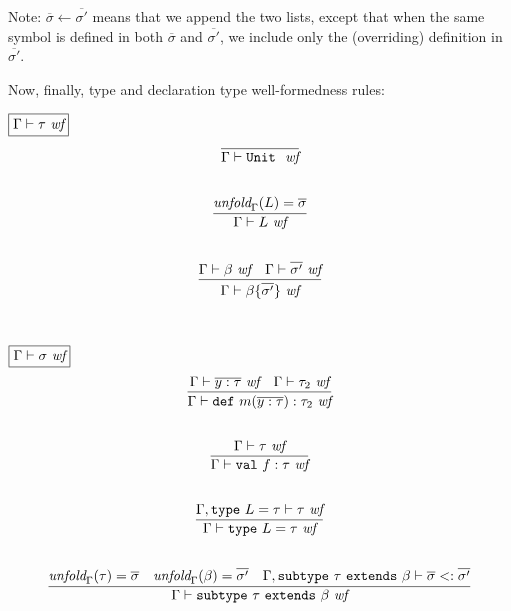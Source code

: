 \documentclass{article}
\newcommand{\keywadj}[1]{\mathtt{#1}}
\newcommand{\keyw}[1]{\keywadj{#1}~}
\begin{document}
Note: $\overline{\sigma} \leftarrow \overline{\sigma'}$ means that we append the two lists, except that when the same symbol is defined in both $\overline{\sigma}$ and $\overline{\sigma'}$, we include only the (overriding) definition in $\overline{\sigma'}$.

Now, finally, type and declaration type well-formedness rules:

$\fbox{$\Gamma \vdash \tau~\textit{wf}$}$
\[
\begin{array}{c}
\infer
  {\Gamma \vdash \keyw{Unit}~\textit{wf}}
  {}\\[5ex]

\infer
  {\Gamma \vdash L~\textit{wf}}
  {\textit{unfold}_\Gamma(L) = \overline{\sigma}}\\[5ex]

\infer
  {\Gamma \vdash \beta \{\overline{\sigma'}\}~\textit{wf}}
  {\Gamma \vdash \beta ~\textit{wf} & \Gamma \vdash \overline{\sigma'}~\textit{wf}}\\[5ex]

\end{array}
\]

$\fbox{$\Gamma \vdash \sigma~\textit{wf}$}$
\[
\begin{array}{c}
\infer
  {\Gamma \vdash \keyw{def} m(\overline{y : \tau}) : \tau_2~\textit{wf}}
  {\Gamma \vdash \overline{y : \tau}~\textit{wf} & \Gamma \vdash \tau_2~\textit{wf}}\\[5ex]

\infer
  {\Gamma \vdash \keyw{val} f : \tau~\textit{wf}}
  {\Gamma \vdash \tau~\textit{wf}}\\[5ex]

\infer
  {\Gamma \vdash \keyw{type} L = \tau~\textit{wf}}
  {\Gamma, \keyw{type} L = \tau \vdash \tau~\textit{wf}}\\[5ex]

\infer
  {\Gamma \vdash \keyw{subtype} \tau ~\keyw{extends} \beta~\textit{wf}}
  {\textit{unfold}_\Gamma(\tau) = \overline{\sigma} & \textit{unfold}_\Gamma(\beta) = \overline{\sigma'} & \Gamma, \keyw{subtype} \tau ~\keyw{extends} \beta \vdash \overline{\sigma} <: \overline{\sigma'}}\\[5ex]

\end{array}
\]



\end{document}
